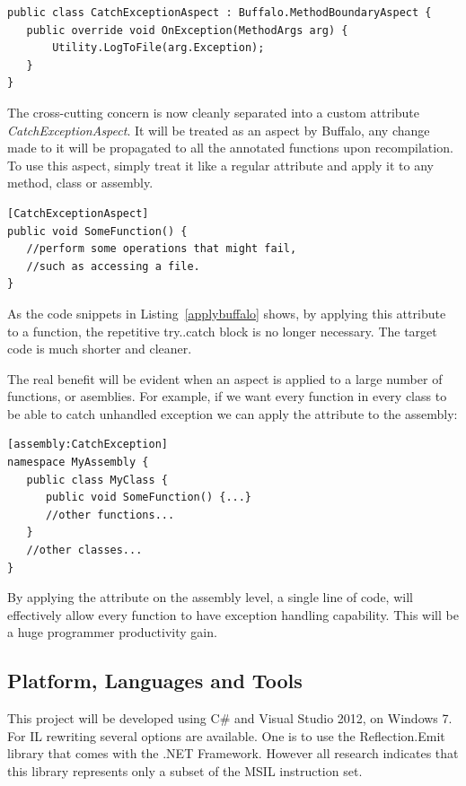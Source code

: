 \begin{lstlisting}[caption={Buffalo aspect}, label=buffalocode]
public class CatchExceptionAspect : Buffalo.MethodBoundaryAspect {
   public override void OnException(MethodArgs arg) {
       Utility.LogToFile(arg.Exception);
   } 
}
\end{lstlisting}

The cross-cutting concern is now cleanly separated into a custom attribute {\em CatchExceptionAspect}. It will be treated as an aspect by Buffalo, any change made to it will be propagated to all the annotated functions upon recompilation. To use this aspect, simply treat it like a regular attribute and apply it to any method, class or assembly.

\begin{lstlisting}[caption={applying Buffalo aspect}, label=applybuffalo]
[CatchExceptionAspect]
public void SomeFunction() {
   //perform some operations that might fail, 
   //such as accessing a file.
}
\end{lstlisting}

As the code snippets in Listing~\ref{applybuffalo} shows, by applying this attribute to a function, the repetitive try..catch block is no longer necessary. The target code is much shorter and cleaner. 

The real benefit will be evident when an aspect is applied to a large number of functions, or asemblies. For example, if we want every function in every class to be able to catch unhandled exception we can apply the attribute to the assembly:

\begin{lstlisting}[caption={applying Buffalo aspect on an assembly}, label=applybuffaloassembly]
[assembly:CatchException]
namespace MyAssembly {
   public class MyClass {
      public void SomeFunction() {...}
      //other functions...
   }
   //other classes...
}
\end{lstlisting}

By applying the attribute on the assembly level, a single line of code, will effectively allow every function to have exception handling capability. This will be a huge programmer productivity gain.

\subsection{Platform, Languages and Tools}
This project will be developed using C\# and Visual Studio 2012, on Windows 7. For IL rewriting several options are available. One is to use the Reflection.Emit library that comes with the .NET Framework. However all research indicates that this library represents only a subset of the MSIL instruction set.

